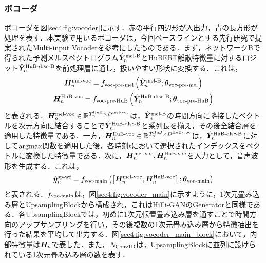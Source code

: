 \subsubsection{ボコーダ}
ボコーダを図\ref{sec4:fig:vocoder}に示す．赤の平行四辺形が入出力，青の長方形が処理を表す．本実験で用いるボコーダは，今回ベースラインとする先行研究\cite{choi2023intelligible}で提案されたMulti-input Vocoderを参考にしたものである．まず，ネットワークBで得られた予測メルスペクトログラム$\hat{\bm{Y}}^{\text{mel-B}}_{n}$とHuBERT離散特徴量に対するロジット$\hat{\bm{Y}}^{\text{HuB-disc-B}}_{n}$を前処理層に通し，扱いやすい形状に変換する．これは，
\begin{gather}
    \bm{H}^{\text{mel-voc}}_{n} = f_{\text{voc-pre-mel}}\left(\hat{\bm{Y}}^{\text{mel-B}}_{n}; \bm{\theta}_{\text{voc-pre-mel}}\right) \\
    \bm{H}^{\text{HuB-voc}}_{n} = f_{\text{voc-pre-HuB}}\left(\hat{\bm{Y}}^{\text{HuB-disc-B}}_{n}; \bm{\theta}_{\text{voc-pre-HuB}}\right)
\end{gather}
と表される．$\bm{H}^{\text{mel-voc}}_{n} \in \mathbb{R}^{T^{\text{HuB}}_{n} \times D^{\text{mel-voc}}}$は，$\hat{\bm{Y}}^{\text{mel-B}}_{n}$の時間方向に隣接したベクトルを次元方向に結合することで$\hat{\bm{Y}}^{\text{HuB-disc-B}}_{n}$と系列長を揃え，その後全結合層を適用した特徴量である．一方，$\bm{H}^{\text{HuB-voc}}_{n} \in \mathbb{R}^{T^{\text{HuB}}_{n} \times D^{\text{HuB-voc}}}$は，$\hat{\bm{Y}}^{\text{HuB-disc-B}}_{n}$に対して$\text{argmax}$関数を適用した後，各時刻$t$において選択されたインデックスをベクトルに変換した特徴量である．次に，$\bm{H}^{\text{mel-voc}}_{n}, \bm{H}^{\text{HuB-voc}}_{n}$を入力として，音声波形を生成する．これは，
\begin{equation}
    \hat{\bm{y}}^{\text{sp-wf}}_{n} = f_{\text{voc-main}}\left(\left[\bm{H}^{\text{mel-voc}}_{n}, \bm{H}^{\text{HuB-voc}}_{n}\right]; \bm{\theta}_{\text{voc-main}}\right)
\end{equation}
と表される．$f_{\text{voc-main}}$は，図\ref{sec4:fig:vocoder_main}に示すように，1次元畳み込み層とUpsamplingBlockから構成され，これはHiFi-GAN\cite{kong2020hifi}のGeneratorと同様である．各UpsamplingBlockでは，初めに1次元転置畳み込み層を通すことで時間方向のアップサンプリングを行い，その後複数の1次元畳み込み層から特徴抽出を行った結果を平均して出力する．図\ref{sec4:fig:vocoder_main_block}において，内部特徴量は$\bm{H}_{n}$で表した．また，$N_{\text{Conv1D}}$は，UpsamplingBlockに並列に設けられている1次元畳み込み層の数を表す．

